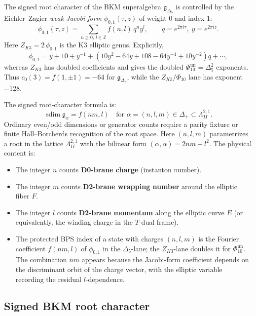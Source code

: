 \documentclass[11pt]{article}
\theoremstyle{definition}
\newcommand{\bZ}{\mathbb{Z}}
\begin{document}
The signed root character of the BKM superalgebra
\(\mathfrak g_{\Delta_5}\) is controlled by the Eichler--Zagier
\emph{weak Jacobi form} \(\phi_{0,1}(\tau,z)\) of weight \(0\) and
index \(1\):
\[
 \phi_{0,1}(\tau, z)
 = \sum_{n \geq 0, \, l \in \bZ} f(n, l) \, q^n y^l,
 \qquad q = e^{2\pi i \tau}, \; y = e^{2\pi i z}.
\]
Here \(Z_{K3}=2\,\phi_{0,1}\) is the K3 elliptic genus. Explicitly,
\[
\phi_{0,1}
=y+10+y^{-1}
 +(10y^2-64y+108-64y^{-1}+10y^{-2})q+\cdots,
\]
whereas \(Z_{K3}\) has doubled coefficients and gives the doubled
\(\Phi_{10}^{\mathrm{un}}=\Delta_5^2\) exponents. Thus
\(c_0(3)=f(1,\pm1)=-64\) for \(\mathfrak g_{\Delta_5}\), while the
\(Z_{K3}/\Phi_{10}\) lane has exponent \(-128\).

The signed root-character formula is:
\begin{equation}
\label{eq:k3e-root-mult}
 \boxed{\operatorname{sdim}\mathfrak g_\alpha = f(nm, l)
 \quad \text{for } \alpha = (n, l, m) \in \Delta_+
 \subset \Lambda^{2,1}_{II}.}
\end{equation}
Ordinary even/odd dimensions or generator counts require a parity fixture
or finite Hall--Borcherds recognition of the root space.
Here $(n,l,m)$ parametrizes a root in the lattice $\Lambda^{2,1}_{II}$
with the bilinear form $(\alpha, \alpha) = 2nm - l^2$. The
physical content is:

\begin{itemize}
 \item The integer $n$ counts \textbf{D0-brane charge} (instanton
 number).
 \item The integer $m$ counts \textbf{D2-brane wrapping number}
 around the elliptic fiber $F$.
 \item The integer $l$ counts \textbf{D2-brane momentum} along the
 elliptic curve $E$ (or equivalently, the winding charge in the
 $T$-dual frame).
 \item The protected BPS index of a state with charges $(n,l,m)$ is
 the Fourier coefficient $f(nm, l)$ of \(\phi_{0,1}\) in the
 \(\Delta_5\)-lane; the \(Z_{K3}\)-lane doubles it for
 \(\Phi_{10}^{\mathrm{un}}\).
 The combination $nm$ appears because the Jacobi-form coefficient
 depends on the discriminant orbit of the charge vector, with the
 elliptic variable recording the residual $l$-dependence.
\end{itemize}

\subsection{Signed BKM root character}
\end{document}
